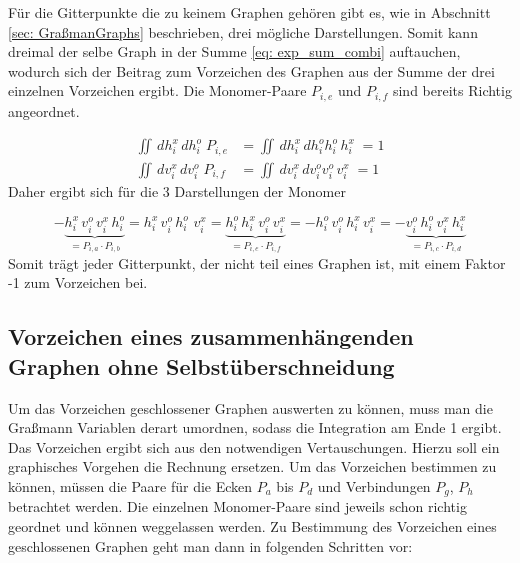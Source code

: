 Für die Gitterpunkte die zu keinem Graphen gehören gibt es, wie in Abschnitt \ref{sec: GraßmanGraphs} beschrieben, drei mögliche Darstellungen. Somit kann dreimal der selbe Graph in der Summe \eqref{eq: exp_sum_combi} auftauchen, wodurch sich der Beitrag zum Vorzeichen des Graphen aus der Summe der drei einzelnen Vorzeichen ergibt. Die Monomer-Paare $P_{i,e}$ und $P_{i,f}$ sind bereits Richtig angeordnet. 

\begin{align}
\iint \,dh_{i}^x\,dh_{i}^o \; P_{i,e} &= \iint \,dh_{i}^x\,dh_{i}^o h_{i}^o\,h_{i}^x\;  = 1\\
\iint \,dv_{i}^x\,dv_{i}^o \; P_{i,f} &= \iint \,dv_{i}^x\,dv_{i}^o v_{i}^o\,v_{i}^x\;  = 1
\end{align} Daher ergibt sich für die 3 Darstellungen der Monomer

\begin{equation}
-\underbrace{h_{i}^x\, v_{i}^o \,v_{i}^x\,h_{i}^o}_{= P_{i,a}\cdot P_{i,b}} 
= h_{i}^x\, v_{i}^o\, h_{i}^o\,\,v_{i}^x 
= \underbrace{h_{i}^o\,h_{i}^x\, v_{i}^o\,v_{i}^x }_{= P_{i,e}\cdot P_{i,f}}= - h_{i}^o\,v_{i}^o\,h_{i}^x\,v_{i}^x 
= -\underbrace{v_{i}^o\,h_{i}^o\,v_{i}^x\,h_{i}^x}_{= P_{i,c}\cdot P_{i,d}}
\end{equation} Somit trägt jeder Gitterpunkt, der nicht teil eines Graphen ist, mit einem Faktor -1 zum Vorzeichen bei.

\subsection{Vorzeichen eines zusammenhängenden Graphen ohne Selbstüberschneidung}

Um das Vorzeichen geschlossener Graphen auswerten zu können, muss man die Graßmann Variablen derart umordnen, sodass die Integration am Ende 1 ergibt. Das Vorzeichen ergibt sich aus den notwendigen Vertauschungen. Hierzu soll ein graphisches Vorgehen die Rechnung ersetzen. Um das Vorzeichen bestimmen zu können, müssen die Paare für die Ecken $P_a$ bis $P_d$ und Verbindungen $P_g$, $P_h$ betrachtet werden. Die einzelnen Monomer-Paare sind jeweils schon richtig geordnet und können weggelassen werden. Zu Bestimmung des Vorzeichen eines geschlossenen Graphen geht man dann in folgenden Schritten vor:


